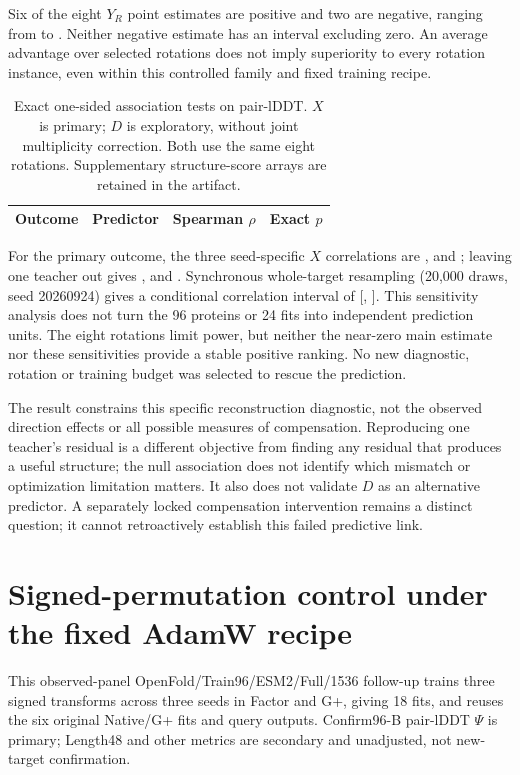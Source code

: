 Six of the eight $Y_R$ point estimates are positive and two are negative,
ranging from  to . Neither negative estimate
has an interval excluding zero. An average advantage over selected rotations
does not imply superiority to every rotation instance, even within this
controlled family and fixed training recipe.

\begin{table}[htbp]\centering\small
\caption{Exact one-sided association tests on pair-lDDT. $X$ is primary;
$D$ is exploratory, without joint multiplicity correction. Both use the same
eight rotations. Supplementary structure-score arrays are retained in the artifact.}
\begin{tabular}{llll}\toprule
Outcome & Predictor & Spearman $\rho$ & Exact $p$ \\\midrule

\end{tabular}
\end{table}

For the primary outcome, the three seed-specific $X$ correlations are
,  and ;
leaving one teacher out gives ,
 and .
Synchronous whole-target resampling (20,000 draws, seed 20260924) gives a
conditional correlation interval of
[, ]. This sensitivity analysis
does not turn the 96 proteins or 24 fits into independent prediction units.
The eight rotations limit power, but neither the near-zero main estimate nor
these sensitivities provide a stable positive ranking. No new diagnostic,
rotation or training budget was selected to rescue the prediction.


The result constrains this specific reconstruction diagnostic, not the
observed direction effects or all possible measures of compensation.
Reproducing one teacher's residual is a different objective from finding any
residual that produces a useful structure; the null association does not
identify which mismatch or optimization limitation matters. It also does not
validate $D$ as an alternative predictor. A separately locked compensation
intervention remains a distinct question; it cannot retroactively establish
this failed predictive link.


\clearpage
\section{Signed-permutation control under the fixed AdamW recipe}
\label{app:signed_control}
This observed-panel OpenFold/Train96/ESM2/Full/1536 follow-up trains three
signed transforms across three seeds in Factor and G+, giving 18 fits, and
reuses the six original Native/G+ fits and query outputs. Confirm96-B pair-lDDT
$\Psi$ is primary; Length48 and other metrics are secondary and unadjusted,
not new-target confirmation.

